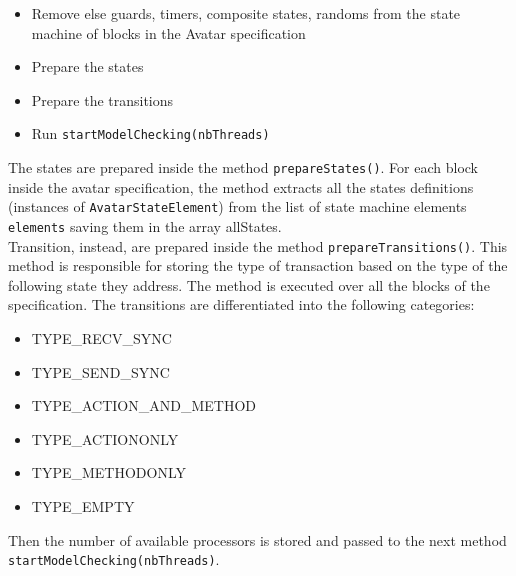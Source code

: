 \documentclass[12pt]{article}
\begin{document}
\begin{itemize}
\item Remove else guards, timers, composite states, randoms from the state machine of blocks in the Avatar specification
\item Prepare the states
\item Prepare the transitions
\item Run \texttt{startModelChecking(nbThreads)}
\end{itemize}
The states are prepared inside the method \texttt{prepareStates()}. For each block inside the avatar specification, the method extracts all the states definitions (instances of \texttt{AvatarStateElement}) from the list of state machine elements \texttt{elements} saving them in the array allStates.
\\
Transition, instead, are prepared inside the method \texttt{prepareTransitions()}. This method is responsible for storing the type of transaction based on the type of the following state they address. The method is executed over all the blocks of the specification. The transitions are differentiated into the following categories:
\begin{itemize}
\item TYPE\_RECV\_SYNC
\item TYPE\_SEND\_SYNC
\item TYPE\_ACTION\_AND\_METHOD
\item TYPE\_ACTIONONLY
\item TYPE\_METHODONLY
\item TYPE\_EMPTY
\end{itemize}
Then the number of available processors is stored and passed to the next method \texttt{startModelChecking(nbThreads)}.
\end{document}
